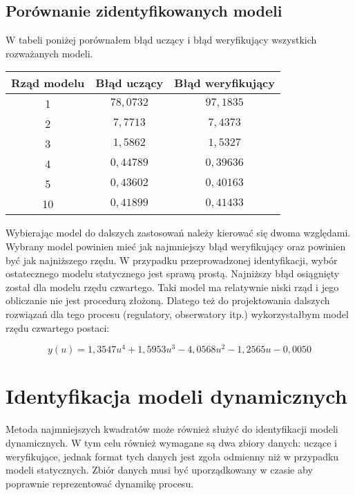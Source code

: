 \documentclass[a4paper,titlepage,11pt,floatssmall]{mwrep}
\begin{document}
\newpage

\subsection{Porównanie zidentyfikowanych modeli}

W tabeli poniżej porównałem błąd uczący i błąd weryfikujący wszystkich rozważanych modeli.
\bigskip
\begin{center}


\begin{tabular}{|c|c|c|}
  \hline 
  Rząd modelu & Błąd uczący & Błąd weryfikujący \\
  \hline
  1 & $78,0732$ & $97,1835$ \\
  \hline
  2 & $7,7713$ & $7,4373$ \\
  \hline
  3 & $1,5862$ & $1,5327$ \\
  \hline
  4 & $0,44789$ & $0,39636$ \\
  \hline
  5 & $0,43602$ & $0,40163$ \\
  \hline
  10 & $0,41899$ & $0,41433$ \\
  \hline
\end{tabular} 
\end{center}

\bigskip
Wybierając model do dalszych zastosowań należy kierować się dwoma względami. Wybrany model powinien mieć jak najmniejszy błąd weryfikujący oraz powinien być jak najniższego rzędu. W przypadku przeprowadzonej identyfikacji, wybór ostatecznego modelu statycznego jest sprawą prostą. Najniższy błąd osiągnięty został dla modelu rzędu czwartego. Taki model ma relatywnie niski rząd i jego obliczanie nie jest procedurą złożoną. Dlatego też do projektowania dalszych rozwiązań dla tego procesu (regulatory, obserwatory itp.) wykorzystałbym model rzędu czwartego postaci: 

\begin{equation*}
y(u) = 1,3547u^4 + 1,5953u^3 - 4,0568u^2 - 1,2565u - 0, 0050
\end{equation*}

\newpage
\section{Identyfikacja modeli dynamicznych}
Metoda najmniejszych kwadratów może również służyć do identyfikacji modeli dynamicznych. W tym celu również wymagane są dwa zbiory danych: uczące i weryfikujące, jednak format tych danych jest zgoła odmienny niż w przypadku modeli statycznych. Zbiór danych musi być uporządkowany w czasie aby poprawnie reprezentować dynamikę procesu.
\end{document}
